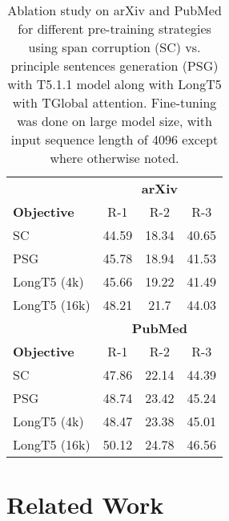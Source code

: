 \documentclass[11pt]{article}
\begin{document}
\begin{table}[t!]
\small
\centering
\begin{tabular}{lccc}
\toprule
& \multicolumn{3}{c}{\textbf{arXiv}} \\
\textbf{Objective} & R-1 & R-2 & R-3\\
\midrule
SC & 44.59 & 18.34 & 40.65 \\
PSG & 45.78 & 18.94 & 41.53 \\
LongT5 (4k) & 45.66 & 19.22 & 41.49 \\
LongT5 (16k) & 48.21 & 21.7 & 44.03 \\
\midrule
& \multicolumn{3}{c}{\textbf{PubMed}} \\
\textbf{Objective} & R-1 & R-2 & R-3\\
\midrule
SC & 47.86 & 22.14 & 44.39 \\
PSG & 48.74 & 23.42 & 45.24 \\
LongT5 (4k) & 48.47 & 23.38 & 45.01 \\
LongT5 (16k) & 50.12 & 24.78 & 46.56 \\
\bottomrule
\end{tabular}
\caption{Ablation study on arXiv and PubMed for different pre-training strategies using span corruption (SC) vs. principle sentences generation (PSG) with T5.1.1 model along with LongT5 with TGlobal attention. Fine-tuning was done on large model size, with input sequence length of 4096 except where otherwise noted.}
\label{tab:pre-training-arxiv}
\end{table}




\section{Related Work}\label{sec:related}
\end{document}
